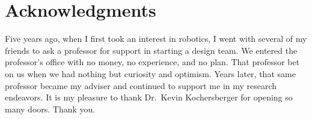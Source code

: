 \chapter*{Acknowledgments}

Five years ago, when I first took an interest in robotics, I went with several of my friends to ask a professor for support in starting a design team. We entered the professor's office with no money, no experience, and no plan. That professor bet on us when we had nothing but curiosity and optimism. Years later, that same professor became my adviser and continued to support me in my research endeavors. It is my pleasure to thank Dr.~Kevin Kochersberger for opening so many doors. Thank you.
